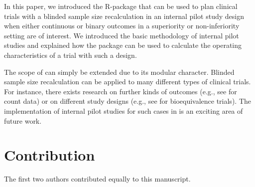 In this paper, we introduced the R-package  that can be
used to plan clinical trials with a blinded sample size recalculation in
an internal pilot study design when either continuous or binary outcomes
in a superiority or non-inferiority setting are of interest. We
introduced the basic methodology of internal pilot studies and explained
how the package can be used to calculate the operating characteristics
of a trial with such a design.

The scope of  can simply be extended due to its modular
character. Blinded sample size recalculation can be applied to many
different types of clinical trials. For instance, there exists research
on further kinds of outcomes (e.g., see \citet{Friede2010} for count
data) or on different study designs (e.g., see \citet{Golkowski2014} for
bioequivalence trials). The implementation of internal pilot studies for
such cases in  is an exciting area of future work.



\hypertarget{contribution}{%
\section{Contribution}\label{contribution}}

The first two authors contributed equally to this manuscript.


\address{%
Lukas Baumann\\
Institute of Medical Biometry\\%
University of Heidelberg\\ Im Neuenheimer Feld 130.3\\ 69120
Heidelberg\\ Germany\\ ORCiD 0000-0001-7931-7470\\
%
%
%
\href{mailto:baumann@imbi.uni-heidelberg.de}{\nolinkurl{baumann@imbi.uni-heidelberg.de}}%
}

\address{%
Maximilian Pilz\\
Institute of Medical Biometry\\%
University of Heidelberg\\ Im Neuenheimer Feld 130.3\\ 69120
Heidelberg\\ Germany\\ ORCiD 0000-0002-9685-1613\\
%
%
%
\href{mailto:pilz@imbi.uni-heidelberg.de}{\nolinkurl{pilz@imbi.uni-heidelberg.de}}%
}

\address{%
Meinhard Kieser\\
Institute of Medical Biometry\\%
University of Heidelberg\\ Im Neuenheimer Feld 130.3\\ 69120
Heidelberg\\ Germany\\ ORCiD 0000-0003-2402-4333\\
%
%
%
\href{mailto:kieser@imbi.uni-heidelberg.de}{\nolinkurl{kieser@imbi.uni-heidelberg.de}}%
}
